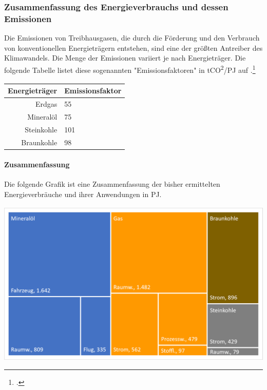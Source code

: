 \documentclass[12pt, ngerman]{article}
\newcommand{\pe}{_{\text{PE}}}
\begin{document}
    \subsubsection{Zusammenfassung des Energieverbrauchs und dessen Emissionen}

    Die Emissionen von Treibhausgasen, die durch die Förderung und den Verbrauch von konventionellen Energieträgern
    entstehen, sind eine der größten Antreiber des Klimawandels.
    Die Menge der Emissionen variiert je nach Energieträger.
    Die folgende Tabelle listet diese sogenannten "Emissionsfaktoren" in \unit{tCO^2/PJ\pe} auf
    .\footcite{balserOlUndGas}

    \begin{center}
        \begin{tabular}{r|l}
            \toprule
            Energieträger & Emissionsfaktor \\
            \midrule
            Erdgas        & 55              \\
            Mineralöl     & 75              \\
            Steinkohle    & 101             \\
            Braunkohle    & 98              \\
            \bottomrule
        \end{tabular}
    \end{center}

    \paragraph{Zusammenfassung}

    Die folgende Grafik ist eine Zusammenfassung der bisher ermittelten Energieverbräuche und ihrer Anwendungen in
    \unit{PJ\pe}.

    \includegraphics{anwendung}
\end{document}
